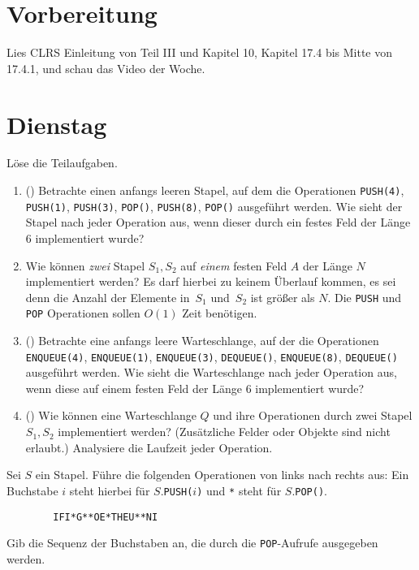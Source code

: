 \documentclass{uebung_cs}
\begin{document}
\section*{Vorbereitung}
Lies CLRS Einleitung von Teil III und Kapitel 10, Kapitel 17.4 bis Mitte von 17.4.1, und schau das Video der Woche.

\section*{Dienstag}

\begin{aufgabe}
	Löse die Teilaufgaben.
	\begin{enumerate}
		\item (\warmup) Betrachte einen anfangs leeren Stapel, auf dem die Operationen \texttt{PUSH(4)}, \texttt{PUSH(1)}, \texttt{PUSH(3)}, \texttt{POP()}, \texttt{PUSH(8)}, \texttt{POP()} ausgeführt werden. Wie sieht der Stapel nach jeder Operation aus, wenn dieser durch ein festes Feld der Länge 6 implementiert wurde?
		\item Wie können \emph{zwei} Stapel $S_1, S_2$ auf \emph{einem} festen Feld $A$ der Länge $N$ implementiert werden?
		Es darf hierbei zu keinem Überlauf kommen, es sei denn die Anzahl der Elemente in~$S_1$ und~$S_2$ ist größer als $N$.
		Die \texttt{PUSH} und \texttt{POP} Operationen sollen $O(1)$ Zeit benötigen.
		\item (\warmup) Betrachte eine anfangs leere Warteschlange, auf der die Operationen \texttt{ENQUEUE(4)}, \texttt{ENQUEUE(1)}, \texttt{ENQUEUE(3)}, \texttt{DEQUEUE()}, \texttt{ENQUEUE(8)}, \texttt{DEQUEUE()} ausgeführt werden. Wie sieht die Warteschlange nach jeder Operation aus, wenn diese auf einem festen Feld der Länge 6 implementiert wurde?
		\item (\hard) Wie können eine Warteschlange $Q$ und ihre Operationen durch zwei Stapel $S_1, S_2$ implementiert werden? (Zusätzliche Felder oder Objekte sind nicht erlaubt.)
		Analysiere die Laufzeit jeder Operation.
	\end{enumerate}
\end{aufgabe}

\begin{aufgabe}
	Sei $S$ ein Stapel.
	Führe die folgenden Operationen von links nach rechts aus: Ein Buchstabe $i$ steht hierbei für $S.$\texttt{PUSH(}$i$\texttt{)} und \verb|*| steht für $S.$\texttt{POP()}.
	\begin{verbatim}
		IFI*G**OE*THEU**NI
	\end{verbatim}
	Gib die Sequenz der Buchstaben an, die durch die \texttt{POP}-Aufrufe ausgegeben werden.
\end{aufgabe}
\end{document}
